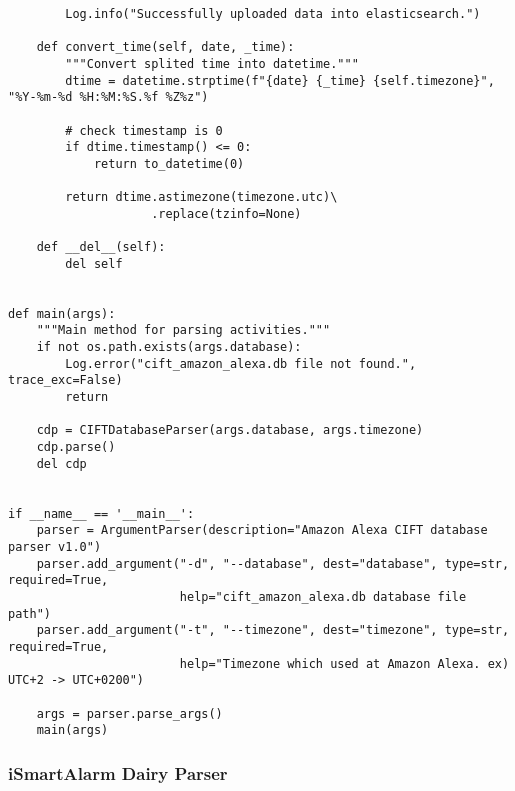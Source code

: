 \documentclass{easychair}
\begin{document}
\begin{lstlisting}
        Log.info("Successfully uploaded data into elasticsearch.")

    def convert_time(self, date, _time):
        """Convert splited time into datetime."""
        dtime = datetime.strptime(f"{date} {_time} {self.timezone}", "%Y-%m-%d %H:%M:%S.%f %Z%z")
        
        # check timestamp is 0
        if dtime.timestamp() <= 0:
            return to_datetime(0)

        return dtime.astimezone(timezone.utc)\
                    .replace(tzinfo=None)

    def __del__(self):
        del self


def main(args):
    """Main method for parsing activities."""
    if not os.path.exists(args.database):
        Log.error("cift_amazon_alexa.db file not found.", trace_exc=False)
        return

    cdp = CIFTDatabaseParser(args.database, args.timezone)
    cdp.parse()
    del cdp


if __name__ == '__main__':
    parser = ArgumentParser(description="Amazon Alexa CIFT database parser v1.0")
    parser.add_argument("-d", "--database", dest="database", type=str, required=True,
                        help="cift_amazon_alexa.db database file path")
    parser.add_argument("-t", "--timezone", dest="timezone", type=str, required=True,
                        help="Timezone which used at Amazon Alexa. ex) UTC+2 -> UTC+0200")

    args = parser.parse_args()
    main(args)

\end{lstlisting}


    
\subsubsection{iSmartAlarm Dairy Parser}
\end{document}

